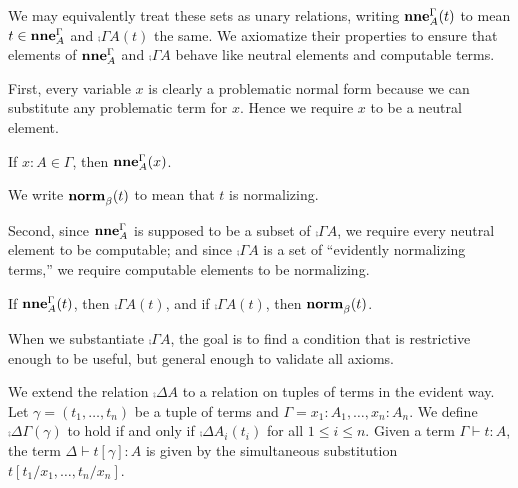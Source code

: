 \documentclass[a4paper]{article}
\begin{document}
We may equivalently treat these sets as unary relations, writing $\operatorname{\mathbf{nne}}^{\Gamma}_{A}(t)$ to mean $t \in \operatorname{\mathbf{nne}}^{\Gamma}_{A}$ and $\comp{\Gamma}{A}(t)$ the same.
We axiomatize their properties to ensure that elements of $\operatorname{\mathbf{nne}}^{\Gamma}_{A}$ and $\comp{\Gamma}{A}$ behave like neutral elements and computable terms.

First, every variable $x$ is clearly a problematic normal form because we can substitute any problematic term for $x$.
Hence we require $x$ to be a neutral element.
\begin{axiom}\label{ax:0002}
  If $x : A \in \Gamma$, then $\operatorname{\mathbf{nne}}^{\Gamma}_{A}(x)$.
\end{axiom}


\begin{notation}
  We write $\operatorname{\mathbf{norm}}^{}_{\beta}(t)$ to mean that $t$ is normalizing.
\end{notation}

Second, since $\operatorname{\mathbf{nne}}^{\Gamma}_{A}$ is supposed to be a subset of $\comp{\Gamma}{A}$, we require every neutral element to be computable; and since $\comp{\Gamma}{A}$ is a set of ``evidently normalizing terms,'' we require computable elements to be normalizing.
\begin{axiom}\label{ax:0000}
  If $\operatorname{\mathbf{nne}}^{\Gamma}_{A}(t)$, then $\comp{\Gamma}{A}(t)$, and if $\comp{\Gamma}{A}(t)$, then $\operatorname{\mathbf{norm}}^{}_{\beta}(t)$.
\end{axiom}

When we substantiate $\comp{\Gamma}{A}$, the goal is to find a condition that is restrictive enough to be useful, but general enough to validate all axioms.

\begin{definition}
  We extend the relation $\comp{\Delta}{A}$ to a relation on tuples of terms in the evident way.
  Let $\gamma = (t_1,\ldots,t_n)$ be a tuple of terms and $\Gamma = x_1 : A_1,\ldots,x_n : A_n$.
  We define $\comp{\Delta}{\Gamma}(\gamma)$ to hold if and only if $\comp{\Delta}{A_i}(t_i)$ for all $1 \leq i \leq n$.
  Given a term $\Gamma \vdash t : A$, the term $\Delta \vdash t[\gamma] : A$ is given by the simultaneous substitution $t[t_1/x_1,\ldots,t_n/x_n]$.
\end{definition}
\end{document}

